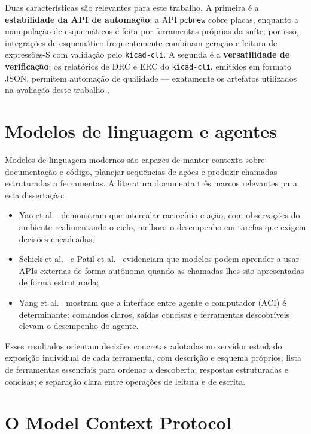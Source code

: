 Duas características são relevantes para este trabalho. A primeira é a
\textbf{estabilidade da API de automação}: a API \texttt{pcbnew} cobre placas,
enquanto a manipulação de esquemáticos é feita por ferramentas próprias da
suíte; por isso, integrações de esquemático frequentemente combinam geração e
leitura de expressões-S com validação pelo \texttt{kicad-cli}. A segunda é a
\textbf{versatilidade de verificação}: os relatórios de DRC e ERC do
\texttt{kicad-cli}, emitidos em formato JSON, permitem automação de
qualidade --- exatamente os artefatos utilizados na avaliação deste trabalho
\citep{kicadcli}.

\section{Modelos de linguagem e agentes}

Modelos de linguagem modernos são capazes de manter contexto sobre
documentação e código, planejar sequências de ações e produzir chamadas
estruturadas a ferramentas. A literatura documenta três marcos relevantes para
esta dissertação:

\begin{itemize}[leftmargin=1.4em,itemsep=0.2em]
  \item Yao et al.~\cite{yao2023react} demonstram que intercalar raciocínio e ação, com
        observações do ambiente realimentando o ciclo, melhora o desempenho em
        tarefas que exigem decisões encadeadas;
  \item Schick et al.~\cite{schick2023toolformer} e Patil
        et al.~\cite{patil2023gorilla} evidenciam que
        modelos podem aprender a usar APIs externas de forma autônoma quando
        as chamadas lhes são apresentadas de forma estruturada;
  \item Yang et al.~\cite{yang2024sweagent} mostram que a interface entre agente e
        computador (ACI) é determinante: comandos claros, saídas concisas e
        ferramentas descobríveis elevam o desempenho do agente.
\end{itemize}

Esses resultados orientam decisões concretas adotadas no servidor estudado:
exposição individual de cada ferramenta, com descrição e esquema próprios;
lista de ferramentas essenciais para ordenar a descoberta; respostas
estruturadas e concisas; e separação clara entre operações de leitura e de
escrita.

\section{O Model Context Protocol}

